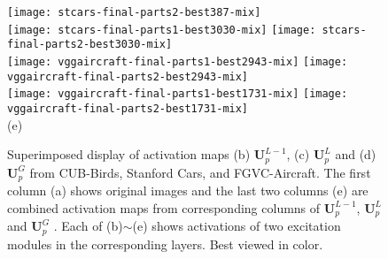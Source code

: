 \documentclass[10pt,twocolumn,letterpaper]{article}
\begin{document}
\begin{figure*}[t]
\begin{center}
\begin{minipage}{0.21\linewidth}
\texttt{[image: stcars-final-parts2-best387-mix]}\\
\texttt{[image: stcars-final-parts1-best3030-mix]}
\texttt{[image: stcars-final-parts2-best3030-mix]}\\
\texttt{[image: vggaircraft-final-parts1-best2943-mix]}
\texttt{[image: vggaircraft-final-parts2-best2943-mix]}\\
\texttt{[image: vggaircraft-final-parts1-best1731-mix]}
\texttt{[image: vggaircraft-final-parts2-best1731-mix]}\\
\centering (e)
\end{minipage}
\end{center}
\caption{Superimposed display of activation maps (b) $\mathbf{U}_p^{L-1}$, (c) $\mathbf{U}_p^L$ and (d) $\mathbf{U}_p^G$  from CUB-Birds, Stanford Cars, and FGVC-Aircraft. The first column (a) shows original images and the last two columns (e) are combined activation maps from corresponding columns of $\mathbf{U}_p^{L-1}$, $\mathbf{U}_p^L$ and $\mathbf{U}_p^G$ . Each of (b)$\sim$(e) shows activations of two excitation modules in the corresponding layers. Best viewed in color.} 
\label{fig:acm}
\end{figure*}
\end{document}
